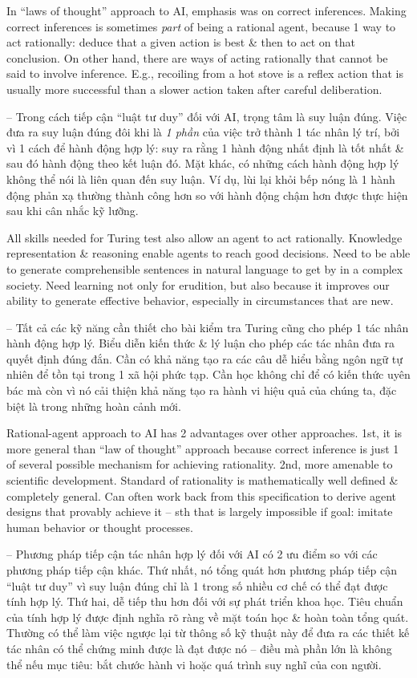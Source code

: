 \documentclass{article}
\begin{document}
\begin{itemize}
\begin{itemize}
\begin{itemize}
\begin{itemize}
				In ``laws of thought'' approach to AI, emphasis was on correct inferences. Making correct inferences is sometimes {\it part}  of being a rational agent, because 1 way to act rationally: deduce that a given action is best \& then to act on that conclusion. On other hand, there are ways of acting rationally that cannot be said to involve inference. E.g., recoiling from a hot stove is a reflex action that is usually more successful than a slower action taken after careful deliberation.

				-- Trong cách tiếp cận ``luật tư duy'' đối với AI, trọng tâm là suy luận đúng. Việc đưa ra suy luận đúng đôi khi là {\it 1 phần} của việc trở thành 1 tác nhân lý trí, bởi vì 1 cách để hành động hợp lý: suy ra rằng 1 hành động nhất định là tốt nhất \& sau đó hành động theo kết luận đó. Mặt khác, có những cách hành động hợp lý không thể nói là liên quan đến suy luận. Ví dụ, lùi lại khỏi bếp nóng là 1 hành động phản xạ thường thành công hơn so với hành động chậm hơn được thực hiện sau khi cân nhắc kỹ lưỡng.

				All skills needed for Turing test also allow an agent to act rationally. Knowledge representation \& reasoning enable agents to reach good decisions. Need to be able to generate comprehensible sentences in natural language to get by in a complex society. Need learning not only for erudition, but also because it improves our ability to generate effective behavior, especially in circumstances that are new.

				-- Tất cả các kỹ năng cần thiết cho bài kiểm tra Turing cũng cho phép 1 tác nhân hành động hợp lý. Biểu diễn kiến thức \& lý luận cho phép các tác nhân đưa ra quyết định đúng đắn. Cần có khả năng tạo ra các câu dễ hiểu bằng ngôn ngữ tự nhiên để tồn tại trong 1 xã hội phức tạp. Cần học không chỉ để có kiến thức uyên bác mà còn vì nó cải thiện khả năng tạo ra hành vi hiệu quả của chúng ta, đặc biệt là trong những hoàn cảnh mới.

				Rational-agent approach to AI has 2 advantages over other approaches. 1st, it is more general than ``law of thought'' approach because correct inference is just 1 of several possible mechanism for achieving rationality. 2nd, more amenable to scientific development. Standard of rationality is mathematically well defined \& completely general. Can often work back from this specification to derive agent designs that provably achieve it -- sth that is largely impossible if goal: imitate human behavior or thought processes.

				-- Phương pháp tiếp cận tác nhân hợp lý đối với AI có 2 ưu điểm so với các phương pháp tiếp cận khác. Thứ nhất, nó tổng quát hơn phương pháp tiếp cận ``luật tư duy'' vì suy luận đúng chỉ là 1 trong số nhiều cơ chế có thể đạt được tính hợp lý. Thứ hai, dễ tiếp thu hơn đối với sự phát triển khoa học. Tiêu chuẩn của tính hợp lý được định nghĩa rõ ràng về mặt toán học \& hoàn toàn tổng quát. Thường có thể làm việc ngược lại từ thông số kỹ thuật này để đưa ra các thiết kế tác nhân có thể chứng minh được là đạt được nó -- điều mà phần lớn là không thể nếu mục tiêu: bắt chước hành vi hoặc quá trình suy nghĩ của con người.


\end{itemize}
\end{itemize}
\end{itemize}
\end{itemize}
\end{document}
